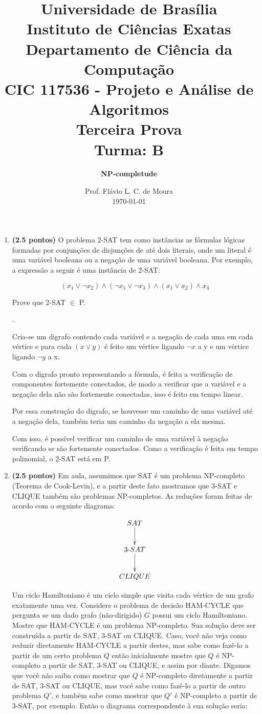 \documentclass[12pt]{article}
\title{{\large Universidade de Brasília \\ Instituto de Ciências Exatas \\
Departamento de Ciência da Computação} \\[1cm]
CIC 117536 - Projeto e Análise de Algoritmos \\[.5cm]  Terceira Prova \\[.5cm] Turma: B}
\author{{\bf NP-completude}}
\date{Prof. Flávio L. C. de Moura \\[.5cm] \today}
\newcommand{\resposta}[1]{ \noindent {\bf Solução}.{\color{blue} #1}}
\begin{document}
\maketitle

\begin{enumerate}
\item {\bf (2.5 pontos)} O problema 2-SAT tem como instâncias as
  fórmulas lógicas formadas por conjunções de disjunções de até dois
  literais, onde um literal é uma variável booleana ou a negação de
  uma variável booleana. Por exemplo, a expressão a seguir é uma
  instância de 2-SAT:

  $$(x_1\lor \neg x_2)\land (\neg x_1 \lor \neg x_3) \land (x_1 \lor x_2) \land x_3$$

  Prove que 2-SAT $\in$ P.

 
  \resposta{
    Cria-se um digrafo contendo cada variável e a negação de cada uma em cada vértice e para cada ${(x\lor y)}$ é feito um vértice ligando ${\neg x}$ a y e um vértice ligando ${\neg y}$ a x.

	Com o digrafo pronto representando a fórmula, é feita a verificação de componentes fortemente conectados, de modo a verificar que a variável e a negação dela não são fortemente conectadas, isso é feito em tempo linear.

	Por essa construção do digrafo, se houvesse um caminho de uma variável até a negação dela, também teria um caminho da negação a ela mesma.

	Com isso, é possível verificar um caminho de uma variável à negação verificando se são fortemente conectados. Como a verificação é feita em tempo polinomial, o 2-SAT está em P.
  }
  
\item {\bf (2.5 pontos)} Em aula, assumimos que SAT é um problema
  NP-completo (Teorema de Cook-Levin), e a partir deste fato mostramos
  que 3-SAT e CLIQUE também são problemas NP-completos. As reduções
  foram feitas de acordo com o seguinte diagrama:

  $$\xymatrix{
    SAT \ar[d] \\
    3\mbox{-}SAT \ar[d] \\
    CLIQUE 
  }$$
  
  Um ciclo Hamiltoniano é um ciclo simple que visita cada vértice de
  um grafo exatamente uma vez. Considere o problema de decisão
  HAM-CYCLE que pergunta se um dado grafo (não-dirigido) $G$ possui um
  ciclo Hamiltoniano. Mostre que HAM-CYCLE é um problema
  NP-completo. Sua solução deve ser construída a partir de SAT, 3-SAT
  ou CLIQUE. Caso, você não veja como reduzir diretamente HAM-CYCLE a
  partir destes, mas sabe como fazê-lo a partir de um certo problema
  $Q$ então inicialmente mostre que $Q$ é NP-completo a partir de SAT,
  3-SAT ou CLIQUE, e assim por diante. Digamos que você não saiba como
  mostrar que $Q$ é NP-completo diretamente a partir de SAT, 3-SAT ou
  CLIQUE, mas você sabe como fazê-lo a partir de outro problema $Q'$,
  e também sabe como mostrar que $Q'$ é NP-completo a partir de 3-SAT,
  por exemplo. Então o diagrama correspondente à sua solução seria:


\end{enumerate}
\end{document}
